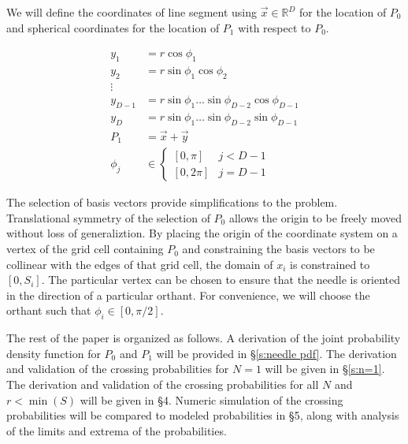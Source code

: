 \documentclass{article}
\begin{document}
We will define the coordinates of line segment using $\vec{x}\in\mathbb{R}^D$ for the location of $P_0$ and spherical coordinates for the location of $P_1$ with respect to $P_0$.

\begin{align*}
    y_1 &= r\cos{\phi_1}\\
    y_2 &= r\sin{\phi_1}\cos{\phi_2}\\
    \vdots\\
    y_{D-1} &= r\sin{\phi_1}\hdots\sin{\phi_{D-2}}\cos{\phi_{D-1}}\\
    y_{D} &= r\sin{\phi_1}\hdots\sin{\phi_{D-2}}\sin{\phi_{D-1}}\\
    P_1 &= \vec{x} + \vec{y}\\
	\phi_j &\in \begin{cases}[0, \pi] & j<D-1 \\ [0, 2\pi] & j=D-1\end{cases}
\end{align*}

The selection of basis vectors provide simplifications to the problem. Translational symmetry of the selection
of $P_0$ allows the origin to be freely moved without loss of generaliztion. By placing the origin of the coordinate
system on a vertex of the grid cell containing $P_0$ and constraining the basis vectors to be collinear with the
edges of that grid cell, the domain of $x_i$ is constrained to $[0, S_i]$. The particular vertex can be chosen
to ensure that the needle is oriented in the direction of a particular orthant. For convenience, we will choose
the orthant such that $\phi_i \in [0, \pi/2].$

The rest of the paper is organized as follows. A derivation of the joint probability density function for $P_0$ and $P_1$ will be provided in \S \ref{s:needle pdf}. The derivation and validation
of the crossing probabilities for $N=1$ will be given in \S \ref{s:n=1}. The derivation and validation of the crossing probabilities for all $N$ and $r<\min(S)$ will be given in \S 4. Numeric
simulation of the crossing probabilities will be compared to modeled probabilities in \S 5, along with analysis of the limits
and extrema of the probabilities.
\end{document}
